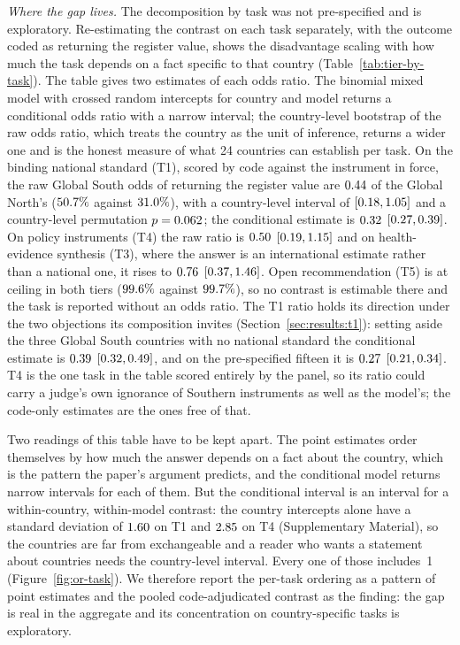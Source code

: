 \emph{Where the gap lives.} The decomposition by task was not pre-specified and
is exploratory. Re-estimating the contrast on each task separately, with the
outcome coded as returning the register value, shows the disadvantage scaling
with how much the task depends on a fact specific to that country
(Table~\ref{tab:tier-by-task}). The table gives two estimates of each odds
ratio. The binomial mixed model with crossed random intercepts for country and
model returns a conditional odds ratio with a narrow interval; the country-level
bootstrap of the raw odds ratio, which treats the country as the unit of
inference, returns a wider one and is the honest measure of what 24 countries
can establish per task. On the binding national standard (T1), scored by code
against the instrument in force, the raw Global South odds of returning the
register value are $0.44$ of the Global North's ($50.7\%$ against
$31.0\%$), with a country-level interval of $[0.18,1.05]$ and a
country-level permutation $p=0.062$; the conditional estimate is
$0.32$ $[0.27,0.39]$. On policy instruments (T4) the raw ratio is
$0.50$ $[0.19,1.15]$ and on health-evidence synthesis (T3), where the
answer is an international estimate rather than a national one, it rises to
$0.76$ $[0.37,1.46]$. Open recommendation (T5) is at ceiling in both
tiers ($99.6\%$ against $99.7\%$), so no contrast is estimable
there and the task is reported without an odds ratio. The T1 ratio holds its
direction under the two objections its composition invites
(Section~\ref{sec:results:t1}): setting aside the three Global South countries
with no national standard the conditional estimate is $0.39$
$[0.32,0.49]$, and on the pre-specified fifteen it is $0.27$ $[0.21,0.34]$.
T4 is the one task in the table scored entirely by the panel, so its ratio
could carry a judge's own ignorance of Southern instruments as well as the
model's; the code-only estimates are the ones free of that.

Two readings of this table have to be kept apart. The point estimates order
themselves by how much the answer depends on a fact about the country, which is
the pattern the paper's argument predicts, and the conditional model returns
narrow intervals for each of them. But the conditional interval is an interval
for a within-country, within-model contrast: the country intercepts alone have
a standard deviation of $1.60$ on T1 and $2.85$ on T4
(Supplementary Material), so the countries are far from exchangeable and a
reader who wants a statement about countries needs the country-level interval.
Every one of those includes~1 (Figure~\ref{fig:or-task}). We therefore report
the per-task ordering as a pattern of point estimates and the pooled
code-adjudicated contrast as the finding: the gap is real in the aggregate and
its concentration on country-specific tasks is exploratory.

